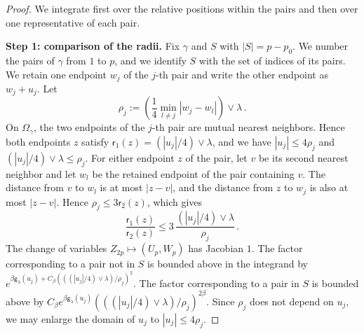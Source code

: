 \documentclass[a4paper,10pt,leqno]{amsart}
\numberwithin{equation}{section}
\def\g{\mathsf{g}}
\def\rr{\mathsf{r}}
\begin{document}
\begin{proof}
  We integrate first over the relative positions within the pairs and then over one representative of each pair.

  \smallskip
  \noindent
  \textbf{Step 1: comparison of the radii.}
  Fix $\gamma$ and $S$ with $|S|=p-p_0$. We number the pairs of $\gamma$ from $1$ to $p$, and we identify $S$ with the set of indices of its pairs. We retain one endpoint $w_j$ of the $j$-th pair and write the other endpoint as $w_j+u_j$. Let
  \[
    \rho_j:=\left(\frac14\min_{l\ne j}|w_j-w_l|\right)\vee\lambda\,.
  \]
  On $\Omega_\gamma$, the two endpoints of the $j$-th pair are mutual nearest neighbors. Hence both endpoints $z$ satisfy $\rr_1(z)=(|u_j|/4)\vee\lambda$, and we have $|u_j|\le4\rho_j$ and $(|u_j|/4)\vee\lambda\le\rho_j$.
  For either endpoint $z$ of the pair, let $v$ be its second nearest neighbor and let $w_l$ be the retained endpoint of the pair containing $v$. The distance from $v$ to $w_l$ is at most $|z-v|$, and the distance from $z$ to $w_j$ is also at most $|z-v|$. Hence $\rho_j\le3\rr_2(z)$, which gives
  \[
    \frac{\rr_1(z)}{\rr_2(z)}\le3\,\frac{(|u_j|/4)\vee\lambda}{\rho_j}\,.
  \]
  The change of variables $Z_{2p}\mapsto(U_p,W_p)$ has Jacobian $1$. The factor corresponding to a pair not in $S$ is bounded above in the integrand by
  $e^{\beta\g_\lambda(u_j)+C_\beta(((|u_j|/4)\vee\lambda)/\rho_j)^2}$.
  The factor corresponding to a pair in $S$ is bounded above by
  $C_\beta e^{\beta\g_\lambda(u_j)}(((|u_j|/4)\vee\lambda)/\rho_j)^{2\beta}$.
  Since $\rho_j$ does not depend on $u_j$, we may enlarge the domain of $u_j$ to $|u_j|\le4\rho_j$.


\end{proof}
\end{document}

